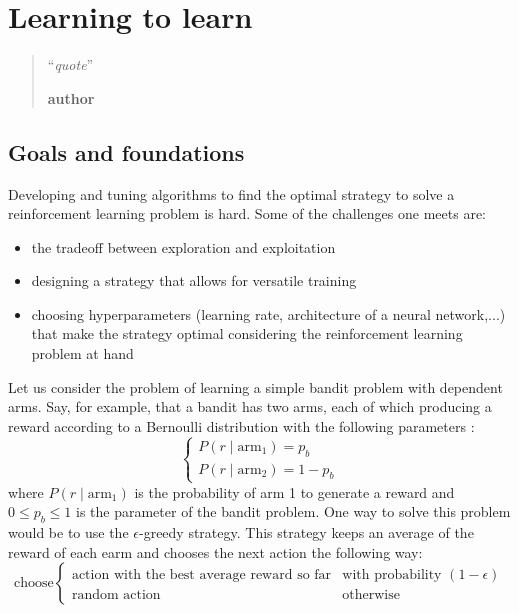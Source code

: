 \chapter{Learning to learn}
\begin{quotation}
\noindent ``\emph{quote}''
\begin{flushright}\textbf{author}\end{flushright}
\end{quotation}

\vspace*{0.5cm}

\section{Goals and foundations}
Developing and tuning algorithms to find the optimal strategy to solve a
reinforcement learning problem is hard. Some of the challenges one meets are:
\begin{itemize}
	\item the tradeoff between exploration and exploitation
	\item designing a strategy that allows for versatile training
	\item choosing hyperparameters (learning rate, architecture of a
		neural network,...)  that make the strategy
		optimal considering the reinforcement learning problem at hand
\end{itemize}

Let us consider the problem of learning a simple bandit problem with dependent
arms. Say, for example, that a bandit has two arms, each of which producing
a reward according to a Bernoulli distribution with the following parameters :
$$ \begin{cases} P(r \mid \text{arm}_1) = p_b \\ 
P(r \mid \text{arm}_2) = 1 - p_b  \end{cases} $$
where $P(r \mid \text{arm}_1)$ is the probability of arm 1 to generate a reward
and $0 \leq p_b \leq 1$ is the parameter of the bandit problem. One way to
solve this problem would be to use the $\epsilon$-greedy strategy. This
strategy keeps an average of the reward of each earm and chooses the next
action the following way:
$$ \text{choose} \begin{cases}
	\text{action with the best average reward so far} & \text{with probability } (1-\epsilon) 
	\\
	\text{random action} & \text{otherwise}
\end{cases}
$$

